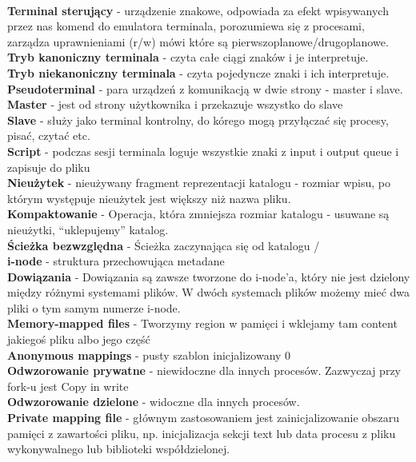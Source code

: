 \documentclass{article}
\begin{document}
\\ \textbf{Terminal sterujący} - urządzenie znakowe, odpowiada za efekt wpisywanych przez nas komend do emulatora terminala, porozumiewa się z procesami, zarządza uprawnieniami (r/w) mówi które są pierwszoplanowe/drugoplanowe.
\\ \textbf{Tryb kanoniczny terminala} - czyta całe ciągi znaków i je interpretuje.
\\ \textbf{Tryb niekanoniczny terminala} - czyta pojedyncze znaki i ich interpretuje.
\\ \textbf{Pseudoterminal} - para urządzeń z komunikacją w dwie strony - master i slave.
\\ \textbf{Master} - jest od strony użytkownika i przekazuje wszystko do slave
\\ \textbf{Slave} - służy jako terminal kontrolny, do kórego mogą przyłączać się procesy, pisać, czytać etc.
\\ \textbf{Script} - podczas sesji terminala loguje wszystkie znaki z input i output queue i zapisuje do pliku
\\ \textbf{Nieużytek} - nieużywany fragment reprezentacji katalogu - rozmiar wpisu, po którym występuje nieużytek jest większy niż nazwa pliku.
\\ \textbf{Kompaktowanie} - Operacja, która zmniejsza rozmiar katalogu - usuwane są nieużytki, “uklepujemy” katalog. 
\\ \textbf{Ścieżka bezwzględna} - Ścieżka zaczynająca się od katalogu /
\\ \textbf{i-node} - struktura przechowująca metadane
\\ \textbf{Dowiązania} - Dowiązania są zawsze tworzone do i-node’a, który nie jest dzielony między różnymi systemami plików. W dwóch systemach plików możemy mieć dwa pliki o tym samym numerze i-node.
\\ \textbf{Memory-mapped files} - Tworzymy region w pamięci i wklejamy tam content jakiegoś pliku albo jego część
\\ \textbf{Anonymous mappings} - pusty szablon inicjalizowany 0
\\ \textbf{Odwzorowanie prywatne} - niewidoczne dla innych procesów. Zazwyczaj przy fork-u jest Copy in write
\\ \textbf{Odwzorowanie dzielone} - widoczne dla innych procesów.
\\ \textbf{Private mapping file} - głównym zastosowaniem jest zainicjalizowanie obszaru pamięci z zawartości pliku, np. inicjalizacja sekcji text lub data procesu z pliku wykonywalnego lub biblioteki współdzielonej.
\end{document}
